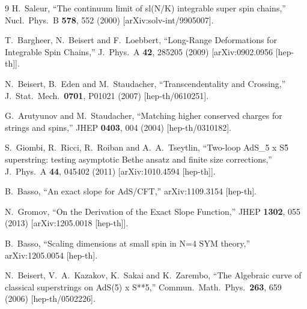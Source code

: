 \documentclass[a4paper,11pt]{article}
\numberwithin{equation}{section}
\begin{document}
\begin{thebibliography} {9}
	H.~Saleur, 
	``The continuum limit of sl(N/K) integrable super spin chains,'' 
	Nucl.\ Phys.\ B {\bf 578}, 552 (2000) 
	[arXiv:solv-int/9905007].

  T.~Bargheer, N.~Beisert and F.~Loebbert,
  ``Long-Range Deformations for Integrable Spin Chains,''
  J.\ Phys.\ A {\bf 42}, 285205 (2009)
  [arXiv:0902.0956 [hep-th]].

  N.~Beisert, B.~Eden and M.~Staudacher,
  ``Transcendentality and Crossing,''
  J.\ Stat.\ Mech.\  {\bf 0701}, P01021 (2007)
  [hep-th/0610251].

  G.~Arutyunov and M.~Staudacher,
  ``Matching higher conserved charges for strings and spins,''
  JHEP {\bf 0403}, 004 (2004)
  [hep-th/0310182].

  S.~Giombi, R.~Ricci, R.~Roiban and A.~A.~Tseytlin,
  ``Two-loop AdS\_5 x S\^5 superstring: testing asymptotic Bethe ansatz and finite size corrections,''
  J.\ Phys.\ A {\bf 44}, 045402 (2011)
  [arXiv:1010.4594 [hep-th]].

  B.~Basso,
  ``An exact slope for AdS/CFT,''
  arXiv:1109.3154 [hep-th].

  N.~Gromov,
  ``On the Derivation of the Exact Slope Function,''
  JHEP {\bf 1302}, 055 (2013)
  [arXiv:1205.0018 [hep-th]].

  B.~Basso,
  ``Scaling dimensions at small spin in N=4 SYM theory,''
  arXiv:1205.0054 [hep-th].

  N.~Beisert, V.~A.~Kazakov, K.~Sakai and K.~Zarembo,
  ``The Algebraic curve of classical superstrings on AdS(5) x S**5,''
  Commun.\ Math.\ Phys.\  {\bf 263}, 659 (2006)
  [hep-th/0502226].


\end{thebibliography}
\end{document}
